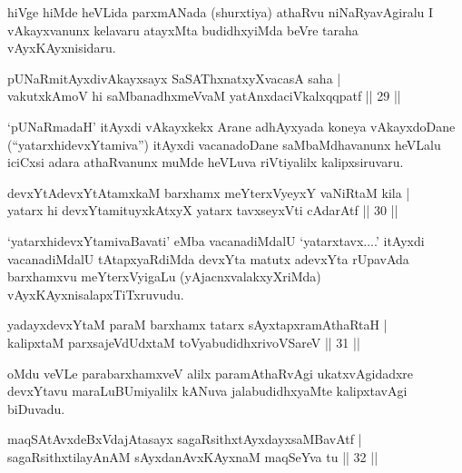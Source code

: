 \begin{artha}
hiVge hiMde heVLida parxmANada (shurxtiya) athaRvu niNaRyavAgiralu I vAkayxvanunx kelavaru atayxMta budidhxyiMda beVre taraha vAyxKAyxnisidaru.
\end{artha}


\begin{shl}
pUNaRmitAyxdivAkayxsayx SaSAThxnatxyXvacasA saha  | \\
vakutxkAmoV hi saMbanadhxmeVvaM yatAnxdaciVkalxqqpatf \hfill||  29 ||  
\end{shl}

\begin{artha}
`pUNaRmadaH' itAyxdi vAkayxkekx Arane adhAyxyada koneya vAkayxdoDane (``yatarxhidevxYtamiva'') itAyxdi vacanadoDane saMbaMdhavanunx heVLalu iciCxsi adara athaRvanunx muMde heVLuva riVtiyalilx kalipxsiruvaru.
\end{artha}


\begin{shl}
devxYtAdevxYtAtamxkaM barxhamx meYterxVyeyxY vaNiRtaM kila  | \\
yatarx hi devxYtamituyxkAtxyX yatarx tavxseyxVti cA\s \s darAtf \hfill||  30 ||  
\end{shl}

\begin{artha}
`yatarxhidevxYtamivaBavati' eMba vacanadiMdalU `yatarxtavx....' itAyxdi vacanadiMdalU tAtapxyaRdiMda devxYta matutx adevxYta rUpavAda barxhamxvu meYterxVyigaLu (yAjacnxvalakxyXriMda) vAyxKAyxnisalapxTiTxruvudu.
\end{artha}

\begin{shl}
yadayxdevxYtaM paraM barxhamx tatarx sAyxtapxramAthaRtaH  | \\
kalipxtaM parxsajeVdUdxtaM toVyabudidhxrivoVSareV \hfill||  31 ||  
\end{shl}

\begin{artha}
oMdu veVLe parabarxhamxveV alilx paramAthaRvAgi ukatxvAgidadxre devxYtavu maraLuBUmiyalilx kANuva jalabudidhxyaMte kalipxtavAgi biDuvadu.
\end{artha}


\begin{shl}
maqSAtAvxdeBxVdajAtasayx sagaRsithxtAyxdayxsaMBavAtf  | \\
sagaRsithxtilayAnAM sAyxdanAvxKAyxnaM maqSeYva tu \hfill||  32 ||  
\end{shl}


